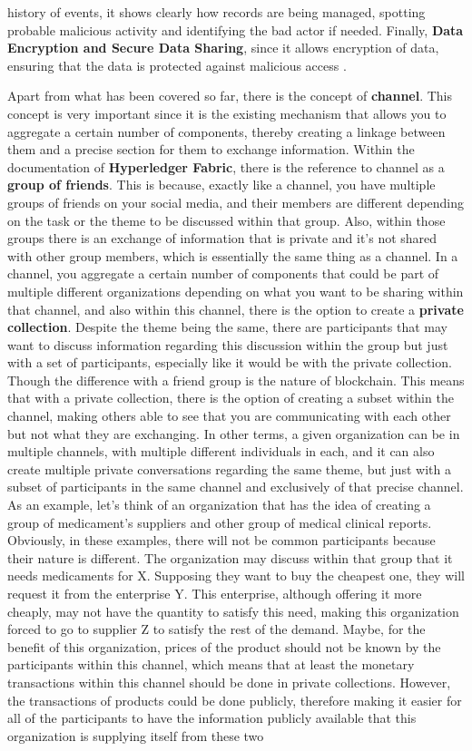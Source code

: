 history of events, it shows clearly how records are being managed, spotting probable malicious activity and identifying the bad actor if needed. Finally, \textbf{Data Encryption and Secure Data Sharing}, since it allows encryption of data, ensuring that the data is protected against malicious access \cite{privacy-hlf}.

Apart from what has been covered so far, there is the concept of \textbf{channel}. This concept is very important since it is the existing mechanism that allows you to aggregate a certain number of components, thereby creating a linkage between them and a precise section for them to exchange information. Within the documentation of \textbf{Hyperledger Fabric}, there is the reference to channel as a \textbf{group of friends}. This is because, exactly like a channel, you have multiple groups of friends on your social media, and their members are different depending on the task or the theme to be discussed within that group. Also, within those groups there is an exchange of information that is private and it's not shared with other group members, which is essentially the same thing as a channel. In a channel, you aggregate a certain number of components that could be part of multiple different organizations depending on what you want to be sharing within that channel, and also within this channel, there is the option to create a \textbf{private collection}. Despite the theme being the same, there are participants that may want to discuss information regarding this discussion within the group but just with a set of participants, especially like it would be with the private collection. Though the difference with a friend group is the nature of blockchain. This means that with a private collection, there is the option of creating a subset within the channel, making others able to see that you are communicating with each other but not what they are exchanging. In other terms, a given organization can be in multiple channels, with multiple different individuals in each, and it can also create multiple private conversations regarding the same theme, but just with a subset of participants in the same channel and exclusively of that precise channel. As an example, let's think of an organization that has the idea of creating a group of medicament's suppliers and other group of medical clinical reports. Obviously, in these examples, there will not be common participants because their nature is different. The organization may discuss within that group that it needs medicaments for X. Supposing they want to buy the cheapest one, they will request it from the enterprise Y. This enterprise, although offering it more cheaply, may not have the quantity to satisfy this need, making this organization forced to go to supplier Z to satisfy the rest of the demand. Maybe, for the benefit of this organization, prices of the product should not be known by the participants within this channel, which means that at least the monetary transactions within this channel should be done in private collections. However, the transactions of products could be done publicly, therefore making it easier for all of the participants to have the information publicly available that this organization is supplying itself from these two 